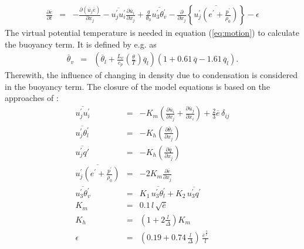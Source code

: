 \documentclass[11pt,a4paper]{scrartcl}
\begin{document}
\begin{eqnarray}
 \frac{\partial \overline e}{\partial t} & = & 
  -\frac{\partial \left(\overline u_{j}\overline e\right)}{\partial x_{j}} 
  -\overline{u_{j}^{'} u_{i}^{'}} \frac{\partial\overline u_{i}}{\partial x_{j}}
  + \frac{g}{\theta_{0}}\overline{u^{'}_{3}\theta_{v}^{'}} 
  -\frac{\partial}{\partial x_{j}}\left\{\overline{u^{'}_{j}\left(e^{'} + \frac{p^{'}}{\rho_{0}}\right)} \right\}- \epsilon
 \label{eq:sgsTKE}
\end{eqnarray}
The virtual potential temperature is needed in equation (\ref{eq:motion}) to calculate the buoyancy term. It is defined by  
e.g. \cite{sommeria77} as 
\begin{eqnarray}
 \overline \theta_{v} &=&
  \left(\overline \theta_{l} + \frac{L_{v}}{c_{p}}\left(\frac{\theta}{T}\right)\overline q_{l}\right)
  \left(1 + 0.61\,\overline q - 1.61\,\overline q_{l}\right).
 \label{eq:theta_v}
\end{eqnarray}
Therewith, the influence of changing in density due to condensation is considered in the buoyancy term. 
\newline
The closure of the model equations is based on the approaches of \cite{deardorff80}:
\begin{eqnarray}
 \label{eq:ujui}
 \overline{u_{j}^{'}u_{i}^{'}} & = & 
  -K_{m}\left(\frac{\partial \overline u_{i}}{\partial x_{j}} 
  + \frac{\partial \overline u_{j}}{\partial x_{i}} \right)
  + \frac{2}{3}\overline e \,\delta_{ij} \\
 \label{eq:ujtheta}
 \overline{u_{j}^{'}\theta_{l}^{'}} & = & 
  -K_{h}\left(\frac{\partial \overline \theta_{l}}{\partial x_{j}}\right) \\
 \label{eq:ujq}
 \overline{u_{j}^{'} q{'}} & = & 
  -K_{h}\left(\frac{\partial \overline q}{\partial x_{j}}\right) \\
 \label{eq:ujp}
 \overline{u^{'}_{j}\left(e^{'} + \frac{p^{'}}{\rho_{0}}\right)} & = &
  -2K_{m}\frac{\partial \overline e}{\partial x_{j}} \\
 \label{eq:u3theta_v}
 \overline{u_{3}^{'}\theta_{v}^{'}} & = &
  K_{1} \,\overline{u_{3}^{'}\theta_{l}^{'}}
  + K_{2} \,\overline{u_{3}^{'} q^{'}} \\
 \label{eq:km} 
  K_{m} & = & 0.1\,l\,\sqrt{\overline e} \\
 \label{eq:kh} 
  K_{h} & = & \left(1+2\frac{l}{\Delta}\right)K_{m} \\
 \label{eq:epsilon} 
  \epsilon & = & \left(0.19 + 0.74\,\frac{l}{\Delta}\right)\,\frac{\overline e^{\frac{3}{2}}}{l}
\end{eqnarray}
\end{document}
